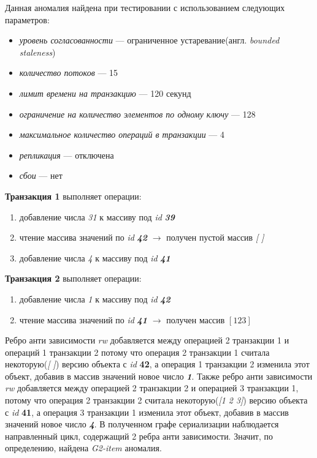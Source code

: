 \documentclass[12pt,  openany]{book}
\begin{document}
\par
Данная аномалия найдена при тестировании с использованием следующих параметров: 
\begin{itemize}
\item[] \textit{уровень согласованности} --- ограниченное устаревание(англ.  \textit{bounded staleness})
\item[] \textit{количество потоков} --- 15
\item[] \textit{лимит времени на транзакцию} --- 120 секунд
\item[] \textit{ограничение на количество элементов по одному ключу} --- 128
\item[] \textit{максимальное количество операций в транзакции} --- 4
\item[] \textit{репликация} --- отключена
\item[] \textit{сбои} --- нет
\end{itemize}

\textbf{Транзакция 1} выполняет операции:
\begin{enumerate}
\item добавление числа \textit{31} к массиву под \textit{id} \textit{\textbf{39}}
\item чтение массива значений по \textit{id} \textit{\textbf{42}} $\rightarrow$ получен пустой массив \textit{[ ]}
\item добавление числа \textit{4} к массиву под \textit{id} \textit{\textbf{41}}
\end{enumerate}

\textbf{Транзакция 2} выполняет операции:
\begin{enumerate}
\item добавление числа \textit{1} к массиву под \textit{id} \textit{\textbf{42}}
\item чтение массива значений по \textit{id} \textit{\textbf{41}} $\rightarrow$ получен массив $[1 2 3]$
\end{enumerate}

Ребро анти зависимости \textit{rw} добавляется между операцией 2 транзакции 1 и операций 1 транзакции 2 потому что операция 2 транзакции 1  считала некоторую(\textit{[ ]}) версию объекта с \textit{id} \textbf{42},  а операция 1 транзакции 2 изменила этот объект, добавив в массив значений новое число \textit{\textbf{1}}.  Также ребро анти зависимости \textit{rw} добавляется между операцией 2 транзакции 2 и операцией 3 транзакции 1, потому что операция 2 транзакции 2  считала некоторую(\textit{[1 2 3]}) версию объекта с \textit{id} \textbf{41},  а операция 3 транзакции 1 изменила этот объект, добавив в массив значений новое число \textit{\textbf{4}}.  В полученном графе сериализации наблюдается направленный цикл, содержащий 2 ребра анти зависимости. Значит, по определению, найдена \textit{G2-item} аномалия.
\end{document}
